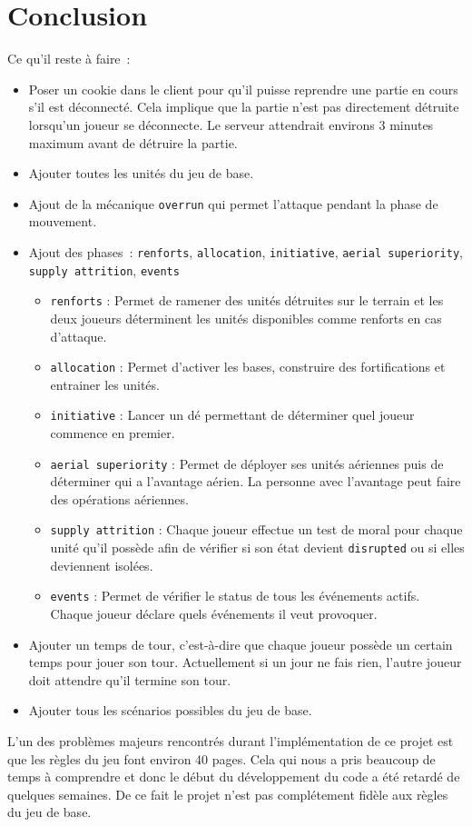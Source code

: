 \section{Conclusion}

Ce qu'il reste à faire :
\begin{itemize}
    \item Poser un cookie dans le client pour qu'il puisse reprendre une partie en cours s'il est déconnecté.
          Cela implique que la partie n'est pas directement détruite lorsqu'un joueur se déconnecte. Le serveur attendrait environs 3 minutes maximum avant de détruire la partie.
    \item Ajouter toutes les unités du jeu de base.
    \item Ajout de la mécanique {\tt overrun} qui permet l'attaque pendant la phase de mouvement.
    \item Ajout des phases : {\tt renforts}, {\tt allocation}, {\tt initiative}, {\tt aerial superiority}, {\tt supply attrition}, {\tt events}
          \begin{itemize}
              \item {\tt renforts} : Permet de ramener des unités détruites sur le terrain et les deux joueurs déterminent les unités disponibles comme renforts en cas d'attaque.
              \item {\tt allocation} : Permet d'activer les bases, construire des fortifications et entrainer les unités.
              \item {\tt initiative} : Lancer un dé permettant de déterminer quel joueur commence en premier.
              \item {\tt aerial superiority} : Permet de déployer ses unités aériennes puis de déterminer qui a l'avantage aérien.
                    La personne avec l'avantage peut faire des opérations aériennes.
              \item {\tt supply attrition} : Chaque joueur effectue un test de moral pour chaque unité qu'il possède afin de vérifier si son état devient {\tt disrupted} ou si elles deviennent isolées.
              \item {\tt events} : Permet de vérifier le status de tous les événements actifs. Chaque joueur déclare quels événements il veut provoquer.
          \end{itemize}
    \item Ajouter un temps de tour, c'est-à-dire que chaque joueur possède un certain temps pour jouer son tour. Actuellement si un jour ne fais rien, l'autre joueur doit attendre qu'il termine son tour.
    \item Ajouter tous les scénarios possibles du jeu de base.
\end{itemize}

L'un des problèmes majeurs rencontrés durant l'implémentation de ce projet est que les règles du jeu font environ 40 pages.
Cela qui nous a pris beaucoup de temps à comprendre et donc le début du développement du code a été retardé de quelques semaines.
De ce fait le projet n'est pas complétement fidèle aux règles du jeu de base.